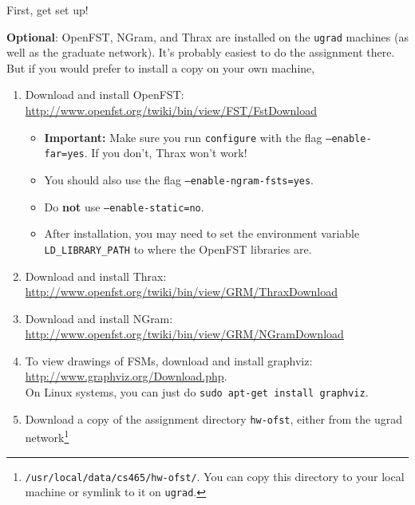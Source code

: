 \documentclass[11pt]{article}
\begin{document}
First, get set up!

{\bf Optional}: OpenFST, NGram, and Thrax are installed on the \texttt{ugrad}
    machines (as well as the graduate network).  It's probably easiest
    to do the assignment there.  But if you would prefer to install a
    copy on your own machine,
    \begin{enumerate}
    \item Download and install OpenFST:
      \\ \url{http://www.openfst.org/twiki/bin/view/FST/FstDownload}

      \begin{itemize}
      \item \textbf{Important:} Make sure you run \texttt{configure} with the flag \texttt{--enable-far=yes}. If you don't, Thrax won't work!

      \item You should also use the flag \texttt{--enable-ngram-fsts=yes}.

      \item Do \textbf{not} use \texttt{--enable-static=no}.

      \item After installation, you may need to set the environment
        variable \verb/LD_LIBRARY_PATH/ to where the OpenFST libraries
        are. %
      \end{itemize}

    \item Download and install Thrax:
      \\ \url{http://www.openfst.org/twiki/bin/view/GRM/ThraxDownload}

    \item Download and install NGram:
      \\ \url{http://www.openfst.org/twiki/bin/view/GRM/NGramDownload}

    \item To view drawings of FSMs, download and install graphviz:
      \\ \url{http://www.graphviz.org/Download.php}.
      \\ On Linux systems, you
      can just do {\tt sudo apt-get install graphviz}.

    \item Download a copy of the assignment directory \texttt{hw-ofst},
      either from the ugrad
      network\footnote{\label{fn:hw-ofst}\texttt{/usr/local/data/cs465/hw-ofst/}.  You
        can copy this directory to your local machine or symlink to it on \texttt{ugrad}.}
    \end{enumerate}
\end{document}
